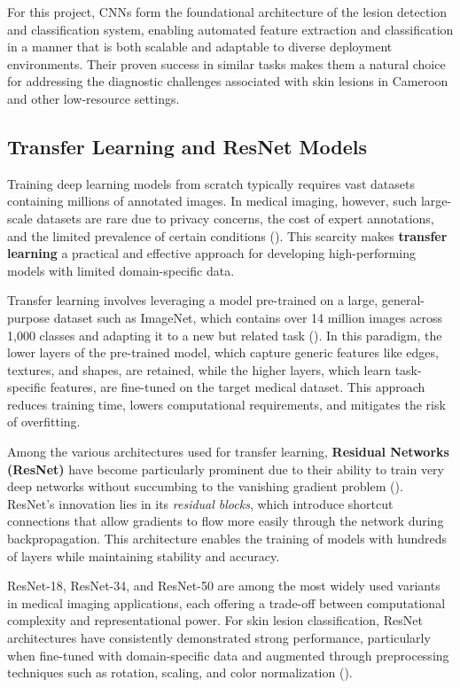\documentclass[
  12pt,
  oneside]{article}
\begin{document}
For this project, CNNs form the foundational architecture of the lesion
detection and classification system, enabling automated feature
extraction and classification in a manner that is both scalable and
adaptable to diverse deployment environments. Their proven success in
similar tasks makes them a natural choice for addressing the diagnostic
challenges associated with skin lesions in Cameroon and other
low-resource settings.

\subsection{Transfer Learning and ResNet
Models}\label{transfer-learning-and-resnet-models}

Training deep learning models from scratch typically requires vast
datasets containing millions of annotated images. In medical imaging,
however, such large-scale datasets are rare due to privacy concerns, the
cost of expert annotations, and the limited prevalence of certain
conditions (). This
scarcity makes \textbf{transfer learning} a practical and effective
approach for developing high-performing models with limited
domain-specific data.

Transfer learning involves leveraging a model pre-trained on a large,
general-purpose dataset such as ImageNet, which contains over 14 million
images across 1,000 classes and adapting it to a new but related task
(). In this paradigm,
the lower layers of the pre-trained model, which capture generic
features like edges, textures, and shapes, are retained, while the
higher layers, which learn task-specific features, are fine-tuned on the
target medical dataset. This approach reduces training time, lowers
computational requirements, and mitigates the risk of overfitting.

Among the various architectures used for transfer learning,
\textbf{Residual Networks (ResNet)} have become particularly prominent
due to their ability to train very deep networks without succumbing to
the vanishing gradient problem (). ResNet's innovation lies in its \emph{residual blocks}, which
introduce shortcut connections that allow gradients to flow more easily
through the network during backpropagation. This architecture enables
the training of models with hundreds of layers while maintaining
stability and accuracy.

ResNet-18, ResNet-34, and ResNet-50 are among the most widely used
variants in medical imaging applications, each offering a trade-off
between computational complexity and representational power. For skin
lesion classification, ResNet architectures have consistently
demonstrated strong performance, particularly when fine-tuned with
domain-specific data and augmented through preprocessing techniques such
as rotation, scaling, and color normalization
().
\end{document}
